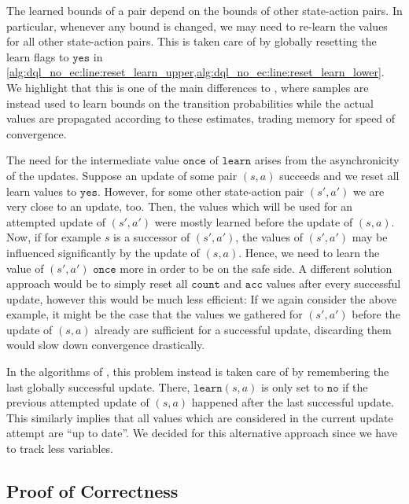 \documentclass{article}
\newcommand{\acc}{\texttt{acc}}
\newcommand{\visitcount}{\texttt{count}}
\newcommand{\learn}{\texttt{learn}}
\newcommand{\learnyes}{\texttt{yes}}
\newcommand{\learnonce}{\texttt{once}}
\newcommand{\learnno}{\texttt{no}}
\begin{document}
The learned bounds of a pair depend on the bounds of other state-action pairs.
In particular, whenever any bound is changed, we may need to re-learn the values for all other state-action pairs.
This is taken care of by globally resetting the learn flags to $\learnyes$ in \cref{alg:dql_no_ec:line:reset_learn_upper,alg:dql_no_ec:line:reset_learn_lower}.
We highlight that this is one of the main differences to \cite{DBLP:conf/cav/AshokKW19}, where samples are instead used to learn bounds on the transition probabilities while the actual values are propagated according to these estimates, trading memory for speed of convergence.

The need for the intermediate value $\learnonce$ of $\learn$ arises from the asynchronicity of the updates.
Suppose an update of some pair $(s, a)$ succeeds and we reset all learn values to $\learnyes$.
However, for some other state-action pair $(s', a')$ we are very close to an update, too.
Then, the values which will be used for an attempted update of $(s', a')$ were mostly learned before the update of $(s, a)$.
Now, if for example $s$ is a successor of $(s', a')$, the values of $(s', a')$ may be influenced significantly by the update of $(s, a)$.
Hence, we need to learn the value of $(s', a')$ $\learnonce$ more in order to be on the safe side.
A different solution approach would be to simply reset all $\visitcount$ and $\acc$ values after every successful update, however this would be much less efficient:
If we again consider the above example, it might be the case that the values we gathered for $(s', a')$ before the update of $(s, a)$ already are sufficient for a successful update, discarding them would slow down convergence drastically.

In the algorithms of \cite{DBLP:conf/icml/StrehlLWLL06,DBLP:conf/atva/BrazdilCCFKKPU14}, this problem instead is taken care of by remembering the last globally successful update.
There, $\learn(s, a)$ is only set to $\learnno$ if the previous attempted update of $(s, a)$ happened after the last successful update.
This similarly implies that all values which are considered in the current update attempt are \enquote{up to date}.
We decided for this alternative approach since we have to track less variables.


\subsection{Proof of Correctness}
\end{document}
